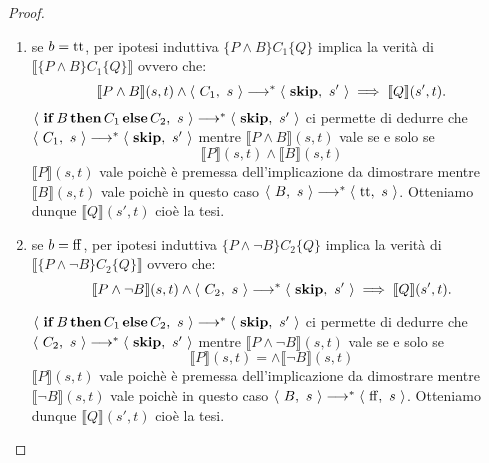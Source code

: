 \begin{teorema}
\begin{proof}
\begin{enumerate}
\item se $b = \mathrm{tt}$, per ipotesi induttiva 
$\{P \land B\} C_1\{Q\}$ implica la verità di 
$\bigl \llbracket \{P \land B\} C_1 \{Q\} \bigr \rrbracket$ ovvero che:
\[
  \llbracket P \land B \rrbracket(s, t) \land 
    \langle\ C_1,\ s\ \rangle \longrightarrow^* \langle\ \mathop{\textup{\textbf{skip}}},\ s'\ \rangle
      \implies \llbracket Q \rrbracket(s', t).
\]
$\langle\ \mathop{\textup{\textbf{if}}} B \mathop{\textup{\textbf{then}}} C_1 \mathop{\textup{\textbf{else}}}
C_2,\ s\ \rangle \longrightarrow^* \langle\ \mathop{\textup{\textbf{skip}}},\ s'\ \rangle$ ci permette di dedurre che
$\langle\ C_1,\ s\ \rangle \longrightarrow^* \langle\ \mathop{\textup{\textbf{skip}}},\ s'\ \rangle$
mentre $\llbracket P \land B \rrbracket(s, t)$ vale se e solo se
\[
  \llbracket P \rrbracket(s, t)
    \land \llbracket B \rrbracket(s, t)
\]
$\llbracket P \rrbracket(s, t)$ vale poichè è premessa
dell'implicazione da dimostrare mentre $\llbracket B \rrbracket(s, t)$ 
vale poichè in questo caso $\langle\ B,\ s\ \rangle \longrightarrow^* \langle\ \mathrm{tt},\ s\ \rangle$.
Otteniamo dunque $\llbracket Q \rrbracket(s', t)$
cioè la tesi.

\item se $b = \mathrm{ff}$, per ipotesi induttiva 
$\{P \land \neg B\} C_2\{Q\}$ implica la verità di 
$\bigl \llbracket \{P \land \neg B\} C_2 \{Q\} \bigr \rrbracket$ ovvero che:
\[
  \llbracket P \land \neg B \rrbracket(s, t) \land 
    \langle\ C_2,\ s\ \rangle \longrightarrow^* \langle\ \mathop{\textup{\textbf{skip}}},\ s'\ \rangle
      \implies \llbracket Q \rrbracket(s', t).
\]

$\langle\ \mathop{\textup{\textbf{if}}} B \mathop{\textup{\textbf{then}}} C_1 \mathop{\textup{\textbf{else}}}
C_2,\ s\ \rangle \longrightarrow^* \langle\ \mathop{\textup{\textbf{skip}}},\ s'\ \rangle$ ci permette di dedurre che
$\langle\ C_2,\ s\ \rangle \longrightarrow^* \langle\ \mathop{\textup{\textbf{skip}}},\ s'\ \rangle$
mentre $\llbracket P \land \neg B \rrbracket(s, t)$ vale se e solo se
\[
  \llbracket P \rrbracket(s, t) = 
    \land \llbracket \neg B \rrbracket(s, t)
\]
$\llbracket P \rrbracket(s, t)$ vale poichè è premessa
dell'implicazione da dimostrare mentre $\llbracket \neg B \rrbracket(s, t)$ 
vale poichè in questo caso $\langle\ B,\ s\ \rangle \longrightarrow^* \langle\ \mathrm{ff},\ s\ \rangle$.
Otteniamo dunque $\llbracket Q \rrbracket(s', t)$
cioè la tesi.
\end{enumerate}
\end{proof}
\end{teorema}
